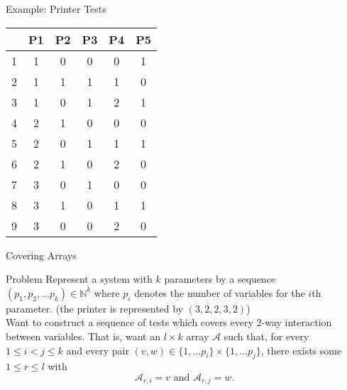 \documentclass[xcolor=table,dvipsnames]{beamer}
\begin{document}
  \begin{frame}{Example: Printer Tests} 
    \begin{center}
    \begin{tabular}{c|ccccc}
      & P1  & P2 & P3    & P4    & P5 \\
      \hline
      1 & 1 & 0 & 0 & 0 & 1 \\
      2 & 1 & 1 & 1 & 1 & 0 \\
      3 & 1 & 0 & 1 & 2 & 1 \\
      4 & 2 & 1 & 0 & 0 & 0 \\
      5 & 2 & 0 & 1 & 1 & 1 \\
      6 & 2 & 1 & 0 & 2 & 0 \\
      7 & 3 & 0 & 1 & 0 & 0 \\
      8 & 3 & 1 & 0 & 1 & 1 \\ 
      9 & 3 & 0 & 0 & 2 & 0 \\
    \end{tabular}
    \end{center}
  \end{frame}

  \begin{frame}{Covering Arrays}\pause

    \begin{block}{Problem}
      Represent a system with $k$ parameters by a sequence $(p_1, p_2, \dots p_k)
      \in \mathbb{N}^k$ where $p_i$ denotes the number of variables for the $i$th
      parameter. (the printer is represented by $(3,2,2,3,2)$)\\[6pt]
      Want to construct a sequence of tests which covers every $2$-way interaction
      between variables. That is, want an $l \times k$ array $\mathcal{A}$ such
      that, for every $1 \leq i < j \leq k$ and every pair $(v,w) \in \{1, \dots
      p_i\} \times \{1, \dots p_j\}$, there exists some $1 \leq r \leq l$ with 
      $$ \mathcal{A}_{r,i} = v \text{ and } \mathcal{A}_{r,j} = w.$$
    \end{block}
  \end{frame}
\end{document}
